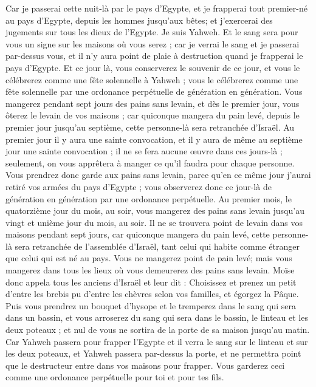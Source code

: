 \begin{multicols}{2}
Car je passerai cette nuit-là par le pays d'Egypte, et je frapperai tout premier-né au pays d'Egypte, depuis les hommes jusqu’aux bêtes; et j'exercerai des jugements sur tous les dieux de l'Egypte. Je suis Yahweh.
Et le sang sera pour vous un signe sur les maisons où vous serez ; car je verrai le sang et je passerai par-dessus vous, et il n'y aura point de plaie à destruction quand je frapperai le pays d'Egypte.
Et ce jour là, vous conserverez le souvenir de ce jour, et vous le célébrerez comme une fête solennelle à Yahweh ; vous le célébrerez comme une fête solennelle par une ordonance perpétuelle de génération en génération.
Vous mangerez pendant sept jours des pains sans levain, et dès le premier jour, vous ôterez le levain de vos maisons ; car quiconque mangera du pain levé, depuis le premier jour jusqu’au septième, cette personne-là sera retranchée d'Israël.
Au premier jour il y aura une sainte convocation, et il y aura de même au septième jour une sainte convocation ; il ne se fera aucune œuvre dans ces jours-là ; seulement, on vous apprêtera à manger ce qu'il faudra pour chaque personne.
Vous prendrez donc garde aux pains sans levain, parce qu'en ce même jour j'aurai retiré vos armées du pays d'Egypte ; vous observerez donc ce jour-là de génération en génération par une ordonance perpétuelle.
Au premier mois, le quatorzième jour du mois, au soir, vous mangerez des pains sans levain jusqu'au vingt et unième jour du mois, au soir.
Il ne se trouvera point de levain dans vos maisons pendant sept jours, car quiconque mangera du pain levé, cette personne-là sera retranchée de l’assemblée d'Israël, tant celui qui habite comme étranger que celui qui est né au pays.
Vous ne mangerez point de pain levé; mais vous mangerez dans tous les lieux où vous demeurerez des pains sans levain.
Moïse donc appela tous les anciens d'Israël et leur dit : Choisissez et prenez un petit d'entre les brebis pu d'entre les chèvres selon vos familles, et égorgez la Pâque.
Puis vous prendrez un bouquet d'hysope et le tremperez dans le sang qui sera dans un bassin, et vous arroserez du sang qui sera dans le bassin, le linteau et les deux poteaux ; et nul de vous ne sortira de la porte de sa maison jusqu'au matin.
Car Yahweh passera pour frapper l'Egypte et il verra le sang sur le linteau et sur les deux poteaux, et Yahweh passera par-dessus la porte, et ne permettra point que le destructeur entre dans vos maisons pour frapper.
Vous garderez ceci comme une ordonance perpétuelle pour toi et pour tes fils.

\end{multicols}
